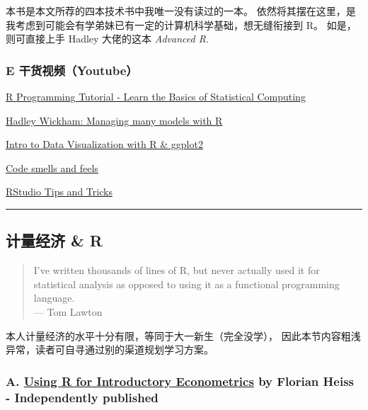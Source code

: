 \documentclass[11pt,hyperref]{ctexart}
\begin{document}
本书是本文所荐的四本技术书中我唯一没有读过的一本。
依然将其摆在这里，是我考虑到可能会有学弟妹已有一定的计算机科学基础，想无缝衔接到
R。 如是，则可直接上手 Hadley 大佬的这本 \emph{Advanced R}.

\hypertarget{e-ux5e72ux8d27ux89c6ux9891youtube}{%
\subsubsection{E
干货视频（Youtube）}\label{e-ux5e72ux8d27ux89c6ux9891youtube}}

\href{https://www.youtube.com/watch?v=_V8eKsto3Ug\&t=6s}{R Programming
Tutorial - Learn the Basics of Statistical Computing}

\href{https://www.youtube.com/watch?v=rz3_FDVt9eg\&t=3221s}{Hadley
Wickham: Managing many models with R}

\href{https://www.youtube.com/watch?v=49fADBfcDD4\&t=3498s}{Intro to
Data Visualization with R \& ggplot2}

\href{https://www.youtube.com/watch?v=7oyiPBjLAWY}{Code smells and
feels}

\href{https://www.youtube.com/watch?v=kuSQgswZdr8}{RStudio Tips and
Tricks}

\begin{center}\rule{0.5\linewidth}{0.5pt}\end{center}

\hypertarget{ux8ba1ux91cfux7ecfux6d4e-r}{%
\subsection{计量经济 \& R}\label{ux8ba1ux91cfux7ecfux6d4e-r}}

\begin{quote}
I've written thousands of lines of R, but never actually used it for
statistical analysis as opposed to using it as a functional programming
language.\\
--- Tom Lawton
\end{quote}

本人计量经济的水平十分有限，等同于大一新生（完全没学），
因此本节内容粗浅异常，读者可自寻通过别的渠道规划学习方案。

\hypertarget{a.-using-r-for-introductory-econometrics-by-florian-heiss---independently-published}{%
\subsubsection{\texorpdfstring{A. \href{http://www.urfie.net/}{Using R
for Introductory Econometrics} by Florian Heiss - Independently
published}{A. Using R for Introductory Econometrics by Florian Heiss - Independently published}}\label{a.-using-r-for-introductory-econometrics-by-florian-heiss---independently-published}}
\end{document}
